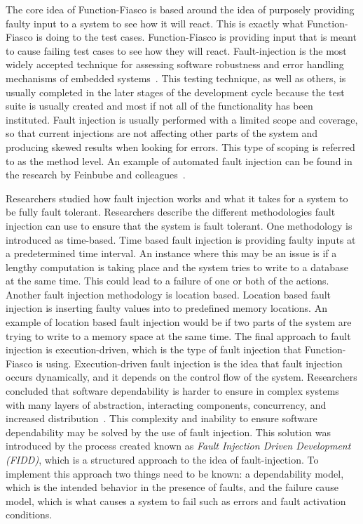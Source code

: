 The core idea of Function-Fiasco is based around the idea of purposely providing faulty input to a system to see how it will react. This is exactly what Function-Fiasco is doing to the test cases. Function-Fiasco is providing input that is meant to cause failing test cases to see how they will react. Fault-injection is the most widely accepted technique for assessing software robustness and error handling mechanisms of embedded systems~\cite{khosrowjerdi2018virtualized}. This testing technique, as well as others, is usually completed in the later stages of the development cycle because the test suite is usually created and most if not all of the functionality has been instituted. Fault injection is usually performed with a limited scope and coverage, so that current injections are not affecting other parts of the system and producing skewed results when looking for errors. This type of scoping is referred to as the method level. An example of automated fault injection can be found in the research by Feinbube and colleagues~\cite{feinbube2018software}.

Researchers studied how fault injection works and what it takes for a system to be fully fault tolerant. Researchers describe the different methodologies fault injection can use to ensure that the system is fault tolerant. One methodology is introduced as time-based. Time based fault injection is providing faulty inputs at a predetermined time interval. An instance where this may be an issue is if a lengthy computation is taking place and the system tries to write to a database at the same time. This could lead to a failure of one or both of the actions. Another fault injection methodology is location based. Location based fault injection is inserting faulty values into to predefined memory locations. An example of location based fault injection would be if two parts of the system are trying to write to a memory space at the same time. The final approach to fault injection is execution-driven, which is the type of fault injection that Function-Fiasco is using. Execution-driven fault injection is the idea that fault injection occurs dynamically, and it depends on the control flow of the system. Researchers concluded that software dependability is harder to ensure in complex systems with many layers of abstraction, interacting components, concurrency, and increased distribution~\cite{feinbube2018software}. This complexity and inability to ensure software dependability may be solved by the use of fault injection. This solution was introduced by the process created known as \textit{Fault Injection Driven Development (FIDD)}, which is a structured approach to the idea of fault-injection. To implement this approach two things need to be known: a dependability model, which is the intended behavior in the presence of faults, and the failure cause model, which is what causes a system to fail such as errors and fault activation conditions.

